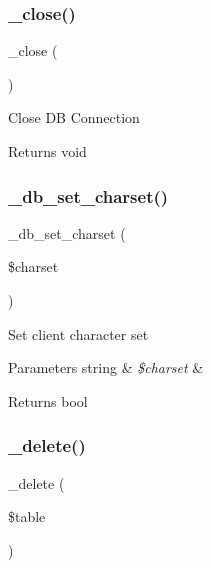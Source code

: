 \subsubsection{\texorpdfstring{\+\_\+close()}{\_close()}}
{\footnotesize\ttfamily \+\_\+close (\begin{DoxyParamCaption}{ }\end{DoxyParamCaption})\hspace{0.3cm}{\ttfamily [protected]}}

Close DB Connection

\begin{DoxyReturn}{Returns}
void 
\end{DoxyReturn}
\mbox{\label{class_c_i___d_b__mssql__driver_a2b808d420d8e9fea0b73ad7127f5efb8}} 
\subsubsection{\texorpdfstring{\+\_\+db\+\_\+set\+\_\+charset()}{\_db\_set\_charset()}}
{\footnotesize\ttfamily \+\_\+db\+\_\+set\+\_\+charset (\begin{DoxyParamCaption}\item[{}]{\$charset }\end{DoxyParamCaption})\hspace{0.3cm}{\ttfamily [protected]}}

Set client character set


\begin{DoxyParams}[1]{Parameters}
string & {\em \$charset} & \\
\hline
\end{DoxyParams}
\begin{DoxyReturn}{Returns}
bool 
\end{DoxyReturn}
\mbox{\label{class_c_i___d_b__mssql__driver_a133ea8446ded52589bd22cc9163d0896}} 
\subsubsection{\texorpdfstring{\+\_\+delete()}{\_delete()}}
{\footnotesize\ttfamily \+\_\+delete (\begin{DoxyParamCaption}\item[{}]{\$table }\end{DoxyParamCaption})\hspace{0.3cm}{\ttfamily [protected]}}

